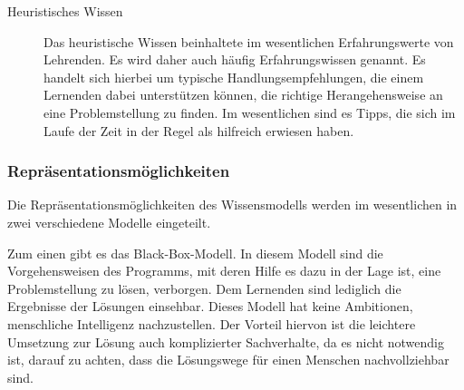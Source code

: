 \begin{description}
	\item[Heuristisches Wissen]
  Das heuristische Wissen beinhaltete im wesentlichen Erfahrungswerte von Lehrenden.
	Es wird daher auch häufig Erfahrungswissen genannt.
	Es handelt sich hierbei um typische Handlungsempfehlungen, die einem Lernenden
	dabei unterstützen können, die richtige Herangehensweise an eine Problemstellung zu finden.
	Im wesentlichen sind es Tipps, die sich im Laufe der Zeit in der Regel als hilfreich erwiesen haben.
\end{description}

\subsubsection{Repräsentationsmöglichkeiten}

Die Repräsentationsmöglichkeiten des Wissensmodells werden im wesentlichen in zwei verschiedene
Modelle eingeteilt.

Zum einen gibt es das \glqq Black-Box-Modell\grqq .
In diesem Modell sind die Vorgehensweisen des Programms, mit deren Hilfe es dazu
in der Lage ist, eine Problemstellung zu lösen, verborgen. Dem Lernenden sind lediglich
die Ergebnisse der Lösungen einsehbar. Dieses Modell hat keine Ambitionen, menschliche
Intelligenz nachzustellen. Der Vorteil hiervon ist die leichtere Umsetzung zur Lösung
auch komplizierter Sachverhalte, da es nicht notwendig ist, darauf zu achten, dass die
Lösungswege für einen Menschen nachvollziehbar sind.

